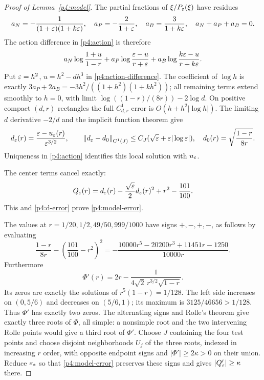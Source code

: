 \label{app:lower-technical-proofs}
\label{app:lower-model-proof}

\begin{proof}[Proof of Lemma~\ref{p4:model}]
The partial fractions of $\xi/P_\varepsilon(\xi)$ have residues
\[
 a_N=-\frac1{(1+\varepsilon)(1+k\varepsilon)},\quad
 a_P=-\frac2{1+\varepsilon},\quad
 a_B=\frac3{1+k\varepsilon},\quad a_N+a_P+a_B=0.
\]
The action difference in \eqref{p4:action} is therefore
\begin{equation}\label{p4:action-difference}
 a_N\log\frac{1+u}{1-r}
 +a_P\log\frac{\varepsilon-u}{r+\varepsilon}
 +a_B\log\frac{k\varepsilon-u}{r+k\varepsilon}.
\end{equation}
Put $\varepsilon=h^2$, $u=h^2-dh^3$ in \eqref{p4:action-difference}.
The coefficient of $\log h$ is exactly
$3a_P+2a_B=-3h^2/((1+h^2)(1+kh^2))$; all remaining terms extend
smoothly to $h=0$, with limit $\log((1-r)/(8r))-2\log d$.
On positive compact $(d,r)$ rectangles the full $C^1_{d,r}$ error is
$O(h+h^2|\log h|)$. The limiting $d$ derivative $-2/d$ and the
implicit function theorem give
\begin{equation}\label{p4:d-error}
 d_\varepsilon(r)=\frac{\varepsilon-u_\varepsilon(r)}{\varepsilon^{3/2}},\qquad
 \left\lVert d_\varepsilon-d_0\right\rVert_{C^1(J)}
 \le C_J(\sqrt{\varepsilon}+\varepsilon|\log\varepsilon|),\quad
 d_0(r)=\sqrt{\frac{1-r}{8r}}.
\end{equation}
Uniqueness in \eqref{p4:action} identifies this local solution with
$u_\varepsilon$.

The center terms cancel exactly:
\begin{equation}\label{p4:center-cancellation}
 Q_\varepsilon(r)=d_\varepsilon(r)-\frac{\sqrt{\varepsilon}}{2}d_\varepsilon(r)^2
               +r^2-\frac{101}{100}.
\end{equation}
This and \eqref{p4:d-error} prove \eqref{p4:model-error}.

The values at $r=1/20,1/2,49/50,999/1000$ have signs $+,-,+,-$,
as follows by evaluating
\[
 \frac{1-r}{8r}-\left(\frac{101}{100}-r^2\right)^2
 =-\frac{10000r^5-20200r^3+11451r-1250}{10000r}.
\]
Furthermore
\[
 \Phi'(r)=2r-\frac1{4\sqrt2\,r^{3/2}\sqrt{1-r}}.
\]
Its zeros are exactly the solutions of $r^5(1-r)=1/128$.
The left side increases on $(0,5/6)$ and decreases on $(5/6,1)$;
its maximum is $3125/46656>1/128$.
Thus $\Phi'$ has exactly two zeros. The alternating signs and Rolle's
theorem give exactly three roots of $\Phi$, all simple: a nonsimple
root and the two intervening Rolle points would give a third root
of $\Phi'$.
Choose $J$ containing the four test points and choose disjoint
neighborhoods $U_j$ of the three roots, indexed in increasing $r$ order,
with opposite endpoint
signs and $|\Phi'|\ge2\kappa>0$ on their union.
Reduce $\varepsilon_*$ so that \eqref{p4:model-error} preserves these
signs and gives $|Q_\varepsilon'|\ge\kappa$ there.
\end{proof}
